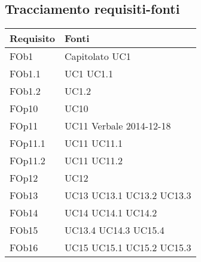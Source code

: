 \newpage
\subsection{ Tracciamento requisiti-fonti}
	
\begin{longtable}{|l|p{4cm}|}
\hline
\textbf{Requisito} & \textbf{Fonti} \\
\hline
FOb1 & Capitolato \linebreak UC1 \linebreak \\ 
\hline
FOb1.1 & UC1 \linebreak  UC1.1 \linebreak  \\ 
\hline
FOb1.2 & UC1.2 \linebreak  \\ 
\hline
FOp10 & UC10 \linebreak \\ 
\hline
FOp11 & UC11 \linebreak Verbale 2014-12-18 \linebreak \\ 
\hline
FOp11.1 & UC11 \linebreak  UC11.1 \linebreak  \\ 
\hline
FOp11.2 & UC11 \linebreak  UC11.2 \linebreak  \\ 
\hline
FOp12 & UC12 \linebreak \\ 
\hline
FOb13 & UC13 \linebreak UC13.1 \linebreak UC13.2 \linebreak UC13.3 \linebreak \\ 
\hline
FOb14 & UC14 \linebreak UC14.1 \linebreak UC14.2 \linebreak \\ 
\hline
FOb15 & UC13.4 \linebreak UC14.3 \linebreak UC15.4 \linebreak \\ 
\hline
FOb16 & UC15 \linebreak UC15.1 \linebreak UC15.2 \linebreak UC15.3 \linebreak \\ 

\end{longtable}
